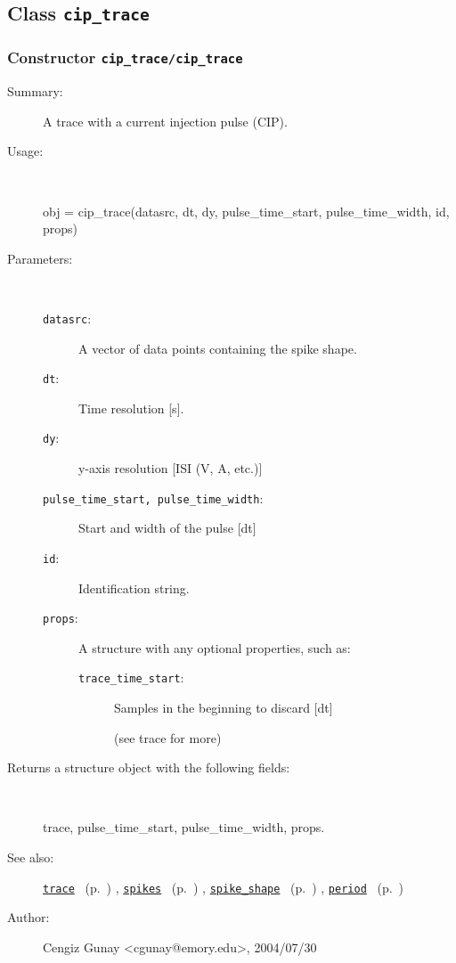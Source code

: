\subsection{Class \texttt{cip\_trace}}%
%
\label{ref_cip_trace}%
\hypertarget{ref_cip_trace}{}%
\subsubsection[Constructor \texttt{cip\_trace}]{Constructor \texttt{cip\_trace/cip\_trace}}%
%
\label{ref_cip_trace__cip_trace}%
\hypertarget{ref_cip_trace__cip_trace}{}%
\begin{description}
\item[Summary:]A trace with a current injection pulse (CIP).
%
\item[Usage:]~%
\begin{lyxcode}%
obj = cip\_trace(datasrc, dt, dy,
		  pulse\_time\_start, pulse\_time\_width, id, props)
%
\end{lyxcode}%
%
%
\item[Parameters:]~
\begin{description}%
\item[\texttt{datasrc}:]
 A vector of data points containing the spike shape.
\item[\texttt{dt}:]
 Time resolution [s].
\item[\texttt{dy}:]
 y-axis resolution [ISI (V, A, etc.)]
\item[\texttt{pulse\_time\_start, pulse\_time\_width}:]


Start and width of the pulse [dt]
\item[\texttt{id}:]
 Identification string.
\item[\texttt{props}:]
 A structure with any optional properties, such as:
\begin{description}%
\item[\texttt{trace\_time\_start}:]
 Samples in the beginning to discard [dt]

(see trace for more)
\end{description}%
\end{description}%
%
\item[Returns a structure object with the following fields:
]~

	trace, pulse\_time\_start, pulse\_time\_width, props.
%
%
\item[See also:]%
\hyperlink{ref_trace}{\texttt{trace}}%
\ (p.~\pageref{ref_trace})%
%
, \hyperlink{ref_spikes}{\texttt{spikes}}%
\ (p.~\pageref{ref_spikes})%
%
, \hyperlink{ref_spike_shape}{\texttt{spike\_shape}}%
\ (p.~\pageref{ref_spike_shape})%
%
, \hyperlink{ref_period}{\texttt{period}}%
\ (p.~\pageref{ref_period})%
%
%
\item[Author:]%
Cengiz Gunay <cgunay@emory.edu>, 2004/07/30
%
\end{description}
\methodline%

